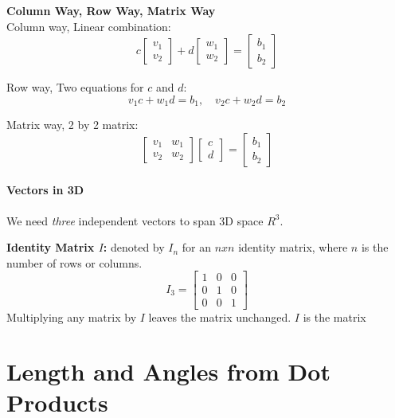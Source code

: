 \begin{mdframed}
	\textbf{Column Way, Row Way, Matrix Way} \\
	\noindent
	Column way, Linear combination:
	\[
		c
		\begin{bmatrix}
			v_{1} \\
			v_{2}
		\end{bmatrix}
		+ d
		\begin{bmatrix}
			w_{1} \\
			w_{2}
		\end{bmatrix}
		=
		\begin{bmatrix}
			b_{1} \\
			b_{2}
		\end{bmatrix}
	\]

	\noindent
	Row way, Two equations for $c$ and $d$:
	\[
		v_{1}c + w_{1}d = b_{1}, \quad v_{2}c + w_{2}d = b_{2}
	\]

	\noindent
	Matrix way, 2 by 2 matrix:
	\[
		\begin{bmatrix}
			v_{1} & w_{1} \\
			v_{2} & w_{2}
		\end{bmatrix}
		\begin{bmatrix}
			c \\
			d
		\end{bmatrix}
		=
		\begin{bmatrix}
			b_{1} \\
			b_{2}
		\end{bmatrix}
	\]
\end{mdframed}

\paragraph{Vectors in 3D}
We need \textit{three} independent vectors to span 3D space $R^3$.

\begin{mdframed}
	\textbf{Identity Matrix $I$:} denoted by $I_n$ for an $nxn$ identity matrix, where $n$ is the number of rows or columns.
	\[
		I_3 =
		\begin{bmatrix}
			1 & 0 & 0 \\
			0 & 1 & 0 \\
			0 & 0 & 1
		\end{bmatrix}
	\]
	Multiplying any matrix by $I$ leaves the matrix unchanged. $I$ is the matrix
\end{mdframed}
\label{sec:vectors_and_linear_combination_end}

\section{Length and Angles from Dot Products}

